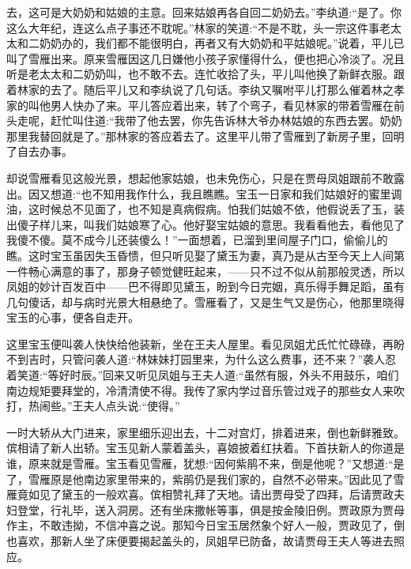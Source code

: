 \begin{parag}
去，这可是大奶奶和姑娘的主意。回来姑娘再各自回二奶奶去。”李纨道:“是了。你这么大年纪，连这么点子事还不耽呢。”林家的笑道:“不是不耽，头一宗这件事老太太和二奶奶办的，我们都不能很明白，再者又有大奶奶和平姑娘呢。”说着，平儿已叫了雪雁出来。原来雪雁因这几日嫌他小孩子家懂得什么，便也把心冷淡了。况且听是老太太和二奶奶叫，也不敢不去。连忙收拾了头，平儿叫他换了新鲜衣服。跟着林家的去了。随后平儿又和李纨说了几句话。李纨又嘱咐平儿打那么催着林之孝家的叫他男人快办了来。平儿答应着出来，转了个弯子，看见林家的带着雪雁在前头走呢，赶忙叫住道:“我带了他去罢，你先告诉林大爷办林姑娘的东西去罢。奶奶那里我替回就是了。”那林家的答应着去了。这里平儿带了雪雁到了新房子里，回明了自去办事。
\end{parag}


\begin{parag}
    却说雪雁看见这般光景，想起他家姑娘，也未免伤心，只是在贾母凤姐跟前不敢露出。因又想道:“也不知用我作什么，我且瞧瞧。宝玉一日家和我们姑娘好的蜜里调油，这时候总不见面了，也不知是真病假病。怕我们姑娘不依，他假说丢了玉，装出傻子样儿来，叫我们姑娘寒了心。他好娶宝姑娘的意思。我看看他去，看他见了我傻不傻。莫不成今儿还装傻么！”一面想着，已溜到里间屋子门口，偷偷儿的瞧。这时宝玉虽因失玉昏愦，但只听见娶了黛玉为妻，真乃是从古至今天上人间第一件畅心满意的事了，那身子顿觉健旺起来，——只不过不似从前那般灵透，所以凤姐的妙计百发百中——巴不得即见黛玉，盼到今日完姻，真乐得手舞足蹈，虽有几句傻话，却与病时光景大相悬绝了。雪雁看了，又是生气又是伤心，他那里晓得宝玉的心事，便各自走开。
\end{parag}


\begin{parag}
    这里宝玉便叫袭人快快给他装新，坐在王夫人屋里。看见凤姐尤氏忙忙碌碌，再盼不到吉时，只管问袭人道:“林妹妹打园里来，为什么这么费事，还不来？”袭人忍着笑道:“等好时辰。”回来又听见凤姐与王夫人道:“虽然有服，外头不用鼓乐，咱们南边规矩要拜堂的，冷清清使不得。我传了家内学过音乐管过戏子的那些女人来吹打，热闹些。”王夫人点头说:“使得。”
\end{parag}


\begin{parag}
    一时大轿从大门进来，家里细乐迎出去，十二对宫灯，排着进来，倒也新鲜雅致。傧相请了新人出轿。宝玉见新人蒙着盖头，喜娘披着红扶着。下首扶新人的你道是谁，原来就是雪雁。宝玉看见雪雁，犹想:“因何紫鹃不来，倒是他呢？”又想道:“是了，雪雁原是他南边家里带来的，紫鹃仍是我们家的，自然不必带来。”因此见了雪雁竟如见了黛玉的一般欢喜。傧相赞礼拜了天地。请出贾母受了四拜，后请贾政夫妇登堂，行礼毕，送入洞房。还有坐床撒帐等事，俱是按金陵旧例。贾政原为贾母作主，不敢违拗，不信冲喜之说。那知今日宝玉居然象个好人一般，贾政见了，倒也喜欢，那新人坐了床便要揭起盖头的，凤姐早已防备，故请贾母王夫人等进去照应。
\end{parag}


